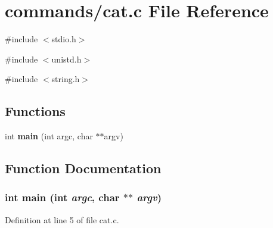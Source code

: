 \section{commands/cat.c File Reference}
\label{cat_8c}
{\ttfamily \#include $<$stdio.h$>$}\par
{\ttfamily \#include $<$unistd.h$>$}\par
{\ttfamily \#include $<$string.h$>$}\par
\subsection*{Functions}
\begin{DoxyCompactItemize}
\item 
int {\bf main} (int argc, char $\ast$$\ast$argv)
\end{DoxyCompactItemize}


\subsection{Function Documentation}
\subsubsection[{main}]{\setlength{\rightskip}{0pt plus 5cm}int main (int {\em argc}, \/  char $\ast$$\ast$ {\em argv})}\label{cat_8c_a3c04138a5bfe5d72780bb7e82a18e627}


Definition at line 5 of file cat.c.

